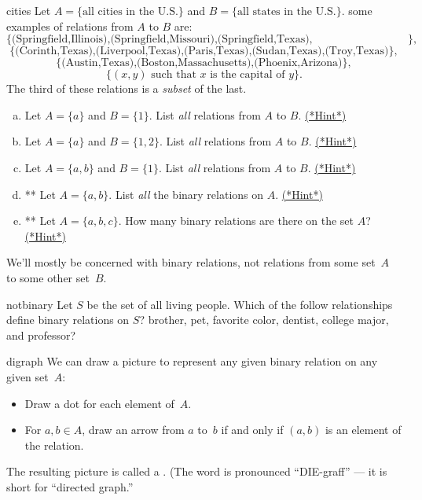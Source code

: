 \begin{example}{cities}
Let $A = \{\text{all cities in the U.S.}\}$ and $B = \{\text{all states in the U.S.}\}$. some examples of relations from $A$ to $B$ are:
\[ \{ \text{(Springfield,Illinois),(Springfield,Missouri),(Springfield,Texas),(Springfield,Wisconsin)}\}, \]
\[ \{ \text{(Corinth,Texas),(Liverpool,Texas),(Paris,Texas),(Sudan,Texas),(Troy,Texas)}\}, \]
\[ \{ \text{(Austin,Texas),(Boston,Massachusetts),(Phoenix,Arizona)}\}, \]
\[ \{ (x,y) \text{ such that } x \text{ is the capital of } y \}. \]
The third of these relations is a \emph{subset} of the last.
\end{example}


\begin{exercise}{7}
\begin{enumerate}[(a)]
\item
Let $A = \{a\}$ and $B = \{1\}$. List \emph{all} relations from $A$ to $B$.
\hyperref[sec:EquivalenceRelations:Hints]{(*Hint*)}
\item
Let $A = \{a\}$ and $B = \{1,2\}$. List \emph{all} relations from $A$ to $B$.
\hyperref[sec:EquivalenceRelations:Hints]{(*Hint*)}
\item
Let $A = \{a,b\}$ and $B = \{1\}$. List \emph{all} relations from $A$ to $B$.
\hyperref[sec:EquivalenceRelations:Hints]{(*Hint*)}
\item
** Let $A = \{a,b\}$. List \emph{all} the binary relations on $A$.
\hyperref[sec:EquivalenceRelations:Hints]{(*Hint*)}
\item
** Let $A = \{a,b,c\}$. How many binary relations are there on the set $A$?
\hyperref[sec:EquivalenceRelations:Hints]{(*Hint*)}
\end{enumerate}
\end{exercise}

We'll mostly be concerned with binary relations, not relations from some set~$A$ to some other set~$B$.

\begin{exercise}{notbinary}
Let $S$ be the set of all living people. Which of the follow relationships define binary relations on $S$?
brother, pet, favorite color, dentist, college major, and professor?
 \end{exercise}

\begin{defn}{digraph} 
We can draw a picture to represent any given binary relation on any given set~$A$:
	\begin{itemize}
	\item Draw a dot for each element of~$A$.
	\item For $a,b \in A$, draw an arrow from $a$ to~$b$ if and only if $(a,b)$ is an element of the relation.
	\end{itemize} 
The resulting picture is called a . (The word is pronounced ``DIE-graff'' --- it is short for ``directed graph.''
\end{defn}
 
